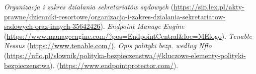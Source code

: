 \begin{thebibliography}{9}
 {\it Organizacja i zakres działania sekretariatów sądowych}
  (\url{https://sip.lex.pl/akty-prawne/dzienniki-resortowe/organizacja-i-zakres-dzialania-sekretariatow-sadowych-oraz-innych-35642426}).
 {\it Endpoint Manage Engine}
  (\url{https://www.manageengine.com/?pos=EndpointCentral&loc=MElogo}).
 {\it Tenable Nessus}
  (\url{https://www.tenable.com/}).
 {\it Opis polityki bezp. według Nflo}
  (\url{https://nflo.pl/slownik/polityka-bezpieczenstwa/#kluczowe-elementy-polityki-bezpieczenstwa}).
(\url{https://www.endpointprotector.com/}).
\end{thebibliography}

